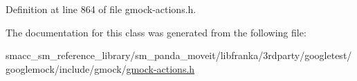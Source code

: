 Definition at line 864 of file gmock-\/actions.\+h.



The documentation for this class was generated from the following file\+:\begin{DoxyCompactItemize}
\item 
smacc\+\_\+sm\+\_\+reference\+\_\+library/sm\+\_\+panda\+\_\+moveit/libfranka/3rdparty/googletest/googlemock/include/gmock/\hyperlink{gmock-actions_8h}{gmock-\/actions.\+h}\end{DoxyCompactItemize}
